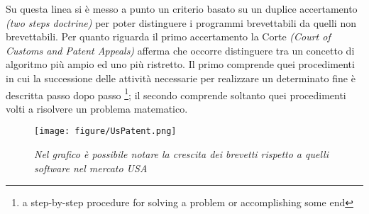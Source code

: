 Su questa linea si è messo a punto un criterio basato su un duplice accertamento \textit{(two steps doctrine)} per poter distinguere i programmi brevettabili da quelli non brevettabili. Per quanto riguarda il primo accertamento la Corte \textit{(Court of Customs and Patent Appeals)} afferma che occorre distinguere tra un concetto di algoritmo più ampio ed uno più ristretto. Il primo comprende quei procedimenti in cui la successione delle attività necessarie per realizzare un determinato fine è descritta passo dopo passo \footnote{a step-by-step procedure for solving a problem or accomplishing some end}; il secondo comprende soltanto quei procedimenti volti a risolvere un problema matematico.




\begin{figure}[bh]
	\begin{center}
		\texttt{[image: figure/UsPatent.png]}
	\end{center}
	\caption{\textit{Nel grafico è possibile notare la crescita dei brevetti rispetto a quelli software nel mercato USA}}
\end{figure}

